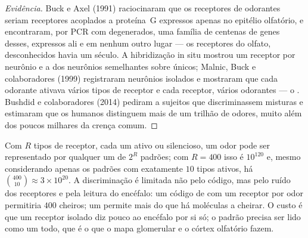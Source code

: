 \begin{proof}[Evidência]
Buck e Axel (1991) raciocinaram que os receptores de odorantes seriam
receptores acoplados a proteína~G expressos apenas no epitélio
olfatório, e encontraram, por PCR com  degenerados, uma
família de centenas de genes desses, expressos ali e em nenhum outro
lugar --- os receptores do olfato, desconhecidos havia um século. A
hibridização in situ mostrou um receptor por neurônio e a 
dos neurônios semelhantes sobre  únicos; Malnic, Buck e
colaboradores (1999) registraram neurônios isolados e mostraram que cada
odorante ativava vários tipos de receptor e cada receptor, vários
odorantes --- o . Bushdid e colaboradores (2014)
pediram a sujeitos que discriminassem misturas e estimaram que os
humanos distinguem mais de um trilhão de odores, muito além dos poucos
milhares da crença comum.
\end{proof}

\begin{proposition}\label{prop:b3:sensory-systems:combinatorial}
Com $R$ tipos de receptor, cada um ativo ou silencioso, um odor pode ser
representado por qualquer um de $2^{R}$ padrões; com $R = 400$ isso é
$10^{120}$ e, mesmo considerando apenas os padrões com exatamente $10$
tipos ativos, há $\binom{400}{10} \approx 3\times 10^{20}$. A
discriminação é limitada não pelo código, mas pelo ruído dos receptores
e pela leitura do encéfalo: um código de  com um receptor
por odor permitiria $400$ cheiros; um  permite mais
do que há moléculas a cheirar. O custo é que um receptor isolado diz
pouco ao encéfalo por si só; o padrão precisa ser lido como um todo, que
é o que o mapa glomerular e o córtex olfatório fazem.
\end{proposition}


